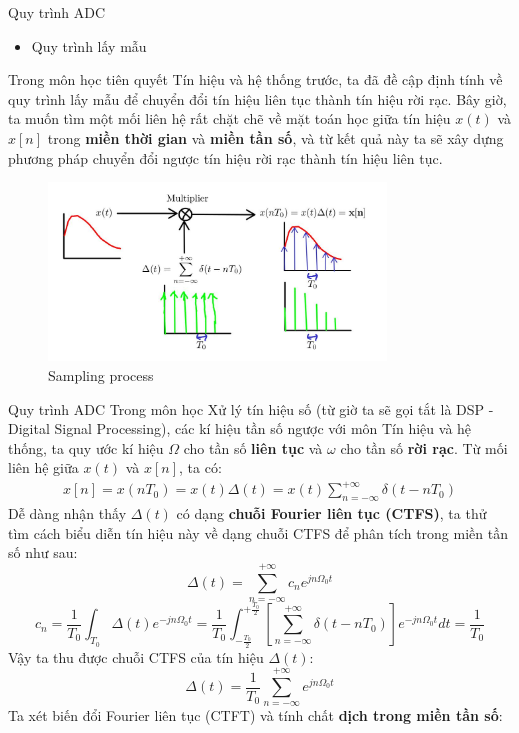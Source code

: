 \documentclass[8pt]{beamer}
\begin{document}
\begin{frame}{Quy trình ADC}
\begin{itemize}
	\item Quy trình lấy mẫu
\end{itemize}
Trong môn học tiên quyết \alert{Tín hiệu và hệ thống} trước, ta đã đề cập định tính về quy trình lấy mẫu để chuyển đổi tín hiệu liên tục thành tín hiệu rời rạc. Bây giờ, ta muốn tìm một mối liên hệ rất chặt chẽ về mặt toán học giữa tín hiệu $x(t)$ và $x[n]$ trong \textbf{miền thời gian} và \textbf{miền tần số}, và từ kết quả này ta sẽ xây dựng phương pháp chuyển đổi ngược tín hiệu rời rạc thành tín hiệu liên tục.
\begin{figure}[h]
			\includegraphics[width=0.8\textwidth]{3.jpg}
			\caption{Sampling process}			\label{fig:re4}
		\end{figure}

\end{frame}
\begin{frame}{Quy trình ADC}
	Trong môn học Xử lý tín hiệu số (từ giờ ta sẽ gọi tắt là DSP - Digital Signal Processing), các kí hiệu tần số \alert{ngược với môn Tín hiệu và hệ thống}, ta quy ước kí hiệu $\Omega$ cho tần số \textbf{liên tục} và $\omega$ cho tần số \textbf{rời rạc}. Từ mối liên hệ giữa $x(t)$ và $x[n]$, ta có:
\begin{equation*}
\begin{split}
	x[n]=x(nT_{0})=x(t)\Delta(t)=x(t)\sum_{n=-\infty}^{+\infty}\delta(t-nT_{0})
\end{split}
\end{equation*}
Dễ dàng nhận thấy $\Delta(t)$ có dạng \textbf{chuỗi Fourier liên tục (CTFS)}, ta thử tìm cách biểu diễn tín hiệu này về dạng chuỗi CTFS để phân tích trong miền tần số như sau:
$$\Delta(t)=\sum_{n=-\infty}^{+\infty}c_{n}e^{jn\Omega_{0}t}$$
$$c_{n}=\frac{1}{T_{0}}\int_{T_{0}}\Delta(t)e^{-jn\Omega_{0}t}=\frac{1}{T_{0}}\int_{-\frac{T_{0}}{2}}^{+\frac{T_{0}}{2}}\left[\sum_{n=-\infty}^{+\infty}\delta(t-nT_{0})\right]e^{-jn\Omega_{0}t}dt=\frac{1}{T_{0}}$$
Vậy ta thu được chuỗi CTFS của tín hiệu $\Delta(t)$: 
$$\Delta(t)=\frac{1}{T_{0}}\sum_{n=-\infty}^{+\infty}e^{jn\Omega_{0}t}$$
Ta xét biến đổi Fourier liên tục (CTFT) và tính chất \textbf{dịch trong miền tần số}:
\end{frame}
\end{document}
